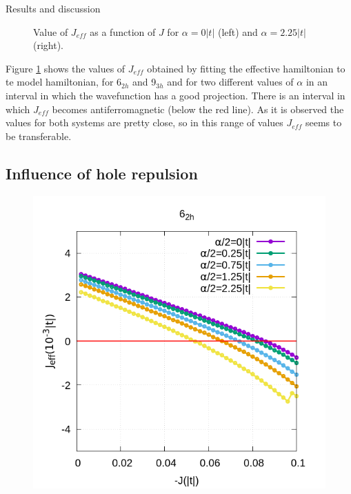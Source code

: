 \documentclass[12pt,twoside]{report}
\begin{document}
\begin{chapter}{Results and discussion}
\begin{figure}[h!]
\begin{minipage}{0.4\textwidth}
		\end{minipage}
		\caption{\label{fig_arj} Value of $J_{eff}$ as a function of $J$ for $\alpha=0|t|$ (left) and $\alpha=2.25|t|$ (right). }
	\end{figure}

	Figure \ref{fig_arj} shows the values of $J_{eff}$ obtained by fitting the
	effective hamiltonian to te model hamiltonian, for 6$_{2h}$ and 9$_{3h}$ and
	for two different values of $\alpha$ in an interval in which the
	wavefunction has a good projection. There is an interval in which $J_{eff}$
	becomes antiferromagnetic (below the red line). As it is observed the values
	for both systems are pretty close, so in this range of values $J_{eff}$
	seems to be transferable.

	

	
	\subsection{Influence of hole repulsion}
		\begin{figure}[h!]
		\centering
		\hspace{-2cm}
		\begin{minipage}{0.4\textwidth}
			\includegraphics[scale=0.35]{Jeff_vs_J_ar2.png}
		\end{minipage}
		\hspace{2cm}

\end{figure}
\end{chapter}
\end{document}
